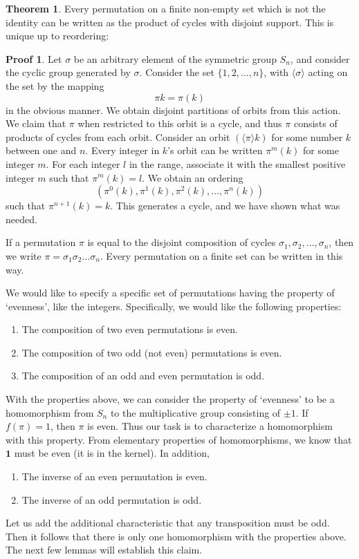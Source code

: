 \documentclass[12pt]{amsbook}
\theoremstyle{definition}
\newtheorem{theorem}{Theorem}[chapter]
\newtheorem*{prf}{Proof}
\newcommand{\gen}[1]{\langle #1 \rangle} %
\begin{document}
\begin{theorem}
Every permutation on a finite non-empty set which is not the identity can be written as the product of cycles with disjoint support. This is unique up to reordering:
\end{theorem}
\begin{prf}
    Let $\sigma$ be an arbitrary element of the symmetric group $S_n$, and consider the cyclic group generated by $\sigma$. Consider the set $\{ 1, 2, \dots, n \}$, with $\gen{\sigma}$ acting on the set by the mapping
    \[ \pi k = \pi(k) \]
    in the obvious manner. We obtain disjoint partitions of orbits from this action. We claim that $\pi$ when restricted to this orbit is a cycle, and thus $\pi$ consists of products of cycles from each orbit. Consider an orbit $(\gen{\pi} k)$ for some number $k$ between one and $n$. Every integer in $k$'s orbit can be written $\pi^m(k)$ for some integer $m$. For each integer $l$ in the range, associate it with the smallest positive integer $m$ such that $\pi^m(k) = l$. We obtain an ordering
    \[ (\pi^0(k), \pi^1(k), \pi^2(k), \dots, \pi^n(k)) \]
    such that $\pi^{n+1}(k) = k$. This generates a cycle, and we have shown what was needed.
\end{prf}

If a permutation $\pi$ is equal to the disjoint composition of cycles $\sigma_1, \sigma_2, \dots, \sigma_n$, then we write $\pi = \sigma_1\sigma_2\dots\sigma_n$. Every permutation on a finite set can be written in this way.

We would like to specify a specific set of permutations having the property of `evenness', like the integers. Specifically, we would like the following properties:
%
\begin{enumerate}
    \item The composition of two even permutations is even.
    \item The composition of two odd (not even) permutations is even.
    \item The composition of an odd and even permutation is odd.
\end{enumerate}
%
With the properties above, we can consider the property of `evenness' to be a homomorphism from $S_n$ to the multiplicative group consisting of $\pm 1$. If $f(\pi) = 1$, then $\pi$ is even. Thus our task is to characterize a homomorphism with this property. From elementary properties of homomorphisms, we know that $\mathbf{1}$ must be even (it is in the kernel). In addition,
%
\begin{enumerate}
    \item The inverse of an even permutation is even.
    \item The inverse of an odd permutation is odd.
\end{enumerate}
%
Let us add the additional characteristic that any transposition must be odd. Then it follows that there is only one homomorphism with the properties above. The next few lemmas will establish this claim.
\end{document}
